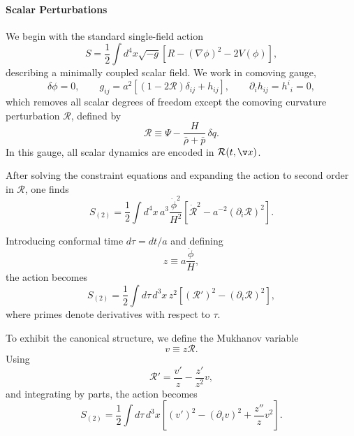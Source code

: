 \paragraph{Scalar Perturbations}

We begin with the standard single-field action
\begin{equation}
\label{eq:stdsinglefield}
S = \frac12 \int d^4x \sqrt{-g} \left[ R - (\nabla\phi)^2 - 2V(\phi) \right],
\end{equation}
describing a minimally coupled scalar field. We work in comoving gauge,
\begin{equation}
\label{eq:gauges}
\delta\phi = 0, \qquad
g_{ij} = a^2 \left[(1-2\mathcal R)\delta_{ij} + h_{ij}\right], \qquad
\partial_i h_{ij} = h^i{}_i = 0 ,
\end{equation}
which removes all scalar degrees of freedom except the comoving curvature perturbation $\mathcal R$, defined by
\begin{equation}
\mathcal R \equiv \Psi - \frac{H}{\bar\rho+\bar p}\,\delta q .
\end{equation}
In this gauge, all scalar dynamics are encoded in $\mathcal R(t,\v x)$.

After solving the constraint equations and expanding the action to second order in $\mathcal R$, one finds
\begin{equation}
\label{eq:secorderstdaction}
S_{(2)} = \frac12 \int d^4x\, a^3 \frac{\dot\phi^2}{H^2}
\left[ \dot{\mathcal R}^2 - a^{-2} (\partial_i \mathcal R)^2 \right].
\end{equation}

Introducing conformal time $d\tau = dt/a$ and defining
\begin{equation}
z \equiv a \frac{\dot\phi}{H},
\end{equation}
the action becomes
\begin{equation}
S_{(2)} = \frac12 \int d\tau\, d^3x\, z^2
\left[ (\mathcal R')^2 - (\partial_i \mathcal R)^2 \right],
\end{equation}
where primes denote derivatives with respect to $\tau$.

To exhibit the canonical structure, we define the Mukhanov variable
\begin{equation}
v \equiv z \mathcal R .
\end{equation}
Using
\begin{equation}
\mathcal R' = \frac{v'}{z} - \frac{z'}{z^2} v ,
\end{equation}
and integrating by parts, the action becomes
\begin{equation}
S_{(2)} = \frac12 \int d\tau\, d^3x
\left[ (v')^2 - (\partial_i v)^2 + \frac{z''}{z} v^2 \right].
\end{equation}


